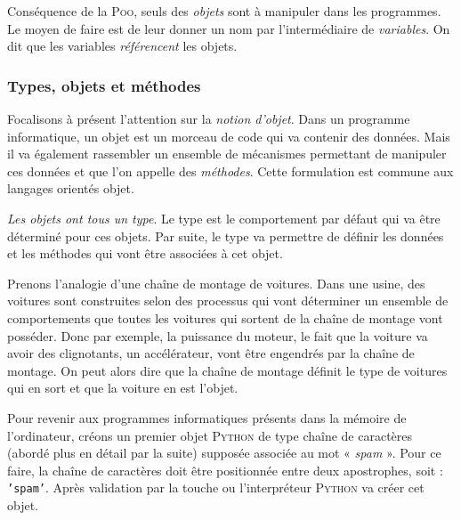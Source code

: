 Conséquence de la \textsc{Poo}, seuls des \emph{objets} sont à manipuler dans les programmes. Le moyen de faire est de leur donner un nom par l'intermédiaire de \emph{variables}. On dit que les variables \emph{référencent} les objets.


\subsubsection[Types, objets et méthodes]{Types, objets et méthodes}
\label{subsub:X.2.1.1}

Focalisons à présent l'attention sur la \emph{notion d'objet}. Dans un programme informatique, un objet est un morceau de code qui va contenir des données. Mais il va également rassembler un ensemble de mécanismes permettant de manipuler ces données et que l'on appelle des \emph{méthodes}. Cette formulation est commune aux langages orientés objet.

\emph{Les objets ont tous un type}. Le type est le comportement par défaut qui va être déterminé pour ces objets. Par suite, le type va permettre de définir les données et les méthodes qui vont être associées à cet objet.

Prenons l'analogie d'une chaîne de montage de voitures. Dans une usine, des voitures sont construites selon des processus qui vont déterminer un ensemble de comportements que toutes les voitures qui sortent de la chaîne de montage vont posséder. Donc par exemple, la puissance du moteur, le fait que la voiture va avoir des clignotants, un accélérateur, vont être engendrés par la chaîne de montage. On peut alors dire que la chaîne de montage définit le type de voitures qui en sort et que la voiture en est l'objet.

Pour revenir aux programmes informatiques présents dans la mémoire de l'ordinateur, créons un premier objet \textsc{Python} de type chaîne de caractères (abordé plus en détail par la suite) supposée associée au mot « \textit{spam} ». Pour ce faire, la chaîne de caractères doit être positionnée entre deux apostrophes, soit : \texttt{'spam'}. Après validation par la touche  ou  l'interpréteur \textsc{Python} va créer cet objet.

